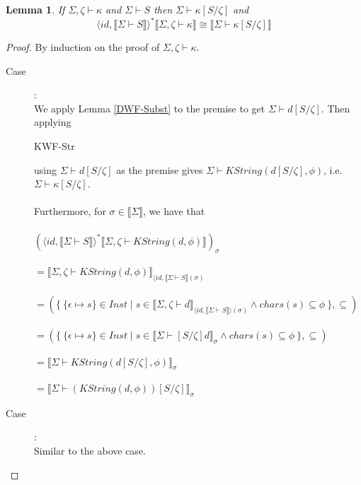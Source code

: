 \documentclass{article}
\newtheorem{lemma}{Lemma}
\newcommand{\sem}[1]{\llbracket #1 \rrbracket}
\begin{document}
\begin{lemma}
If $\Sigma,\zeta \vdash \kappa$ and $\Sigma \vdash S$ then $\Sigma \vdash \kappa[S/\zeta]$ and $$\langle \mathit{id}, \sem{\Sigma \vdash S} \rangle^* \sem{\Sigma,\zeta \vdash \kappa} \cong \sem{\Sigma \vdash \kappa[S/\zeta]}$$ 
\end{lemma}

\begin{proof}
By induction on the proof of $\Sigma,\zeta \vdash \kappa$. 

\begin{description}
\item[Case ]:~\\
We apply Lemma \ref{DWF-Subst} to the premise to get $\Sigma \vdash d[S/\zeta]$. Then applying 
\begin{sc}KWF-Str\end{sc} using $\Sigma \vdash d[S/\zeta]$ as the premise gives 
$\Sigma \vdash \mathit{KString}(d[S/\zeta],\phi)$, i.e. $\Sigma \vdash \kappa[S/\zeta]$.\\~\\
Furthermore, for $\sigma \in \sem{\Sigma}$, we have that\\~\\
$(\langle \mathit{id}, \sem{\Sigma \vdash S} \rangle^* \sem{\Sigma,\zeta \vdash \mathit{KString(d,\phi)}})_\sigma$\\~\\
$= \sem{\Sigma,\zeta \vdash \mathit{KString(d,\phi)}}_{\langle \mathit{id}, \sem{\Sigma \vdash S}(\sigma)}$\\~\\
$= (\{~\{ \epsilon \mapsto s \} \in \mathit{Inst} \mid s \in \sem{\Sigma,\zeta \vdash d}_{\langle \mathit{id}, \sem{\Sigma \vdash S} \rangle (\sigma)} \wedge \mathit{chars}(s) \subseteq \phi ~\} , \subseteq)$\\~\\
$= (\{~\{ \epsilon \mapsto s \} \in \mathit{Inst} \mid s \in \sem{\Sigma \vdash [S/\zeta]d}_{\sigma} \wedge \mathit{chars}(s) \subseteq \phi ~\} , \subseteq)$\\~\\
$= \sem{\Sigma \vdash \mathit{KString(d[S/\zeta],\phi)}}_\sigma$\\~\\
$= \sem{\Sigma \vdash (\mathit{KString(d,\phi)})[S/\zeta]}_\sigma$

\item[Case ]:~\\
Similar to the above case.


\end{description}
\end{proof}
\end{document}

